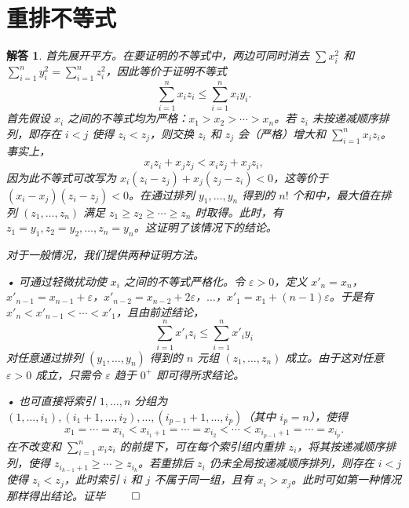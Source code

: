 \documentclass[12pt,UTF8]{ctexbook}
\theoremstyle{exercisestyle}
\theoremstyle{solutionstyle}
\newtheorem*{solution*}{解答}
\newenvironment{solution}
  {\begin{solution*}}
  {\hfill\ensuremath{\qed}\end{solution*}}
\begin{document}
\section{重排不等式}
\begin{solution}
首先展开平方。在要证明的不等式中，两边可同时消去 \(\sum x_i^2\) 和 \(\sum_{i=1}^{n} y_i^2 = \sum_{i=1}^{n} z_i^2\)，因此等价于证明不等式
\[
\sum_{i=1}^{n} x_i z_i \leqslant \sum_{i=1}^{n} x_i y_i.
\]
首先假设 \(x_i\) 之间的不等式均为严格：\(x_1 > x_2 > \cdots > x_n\)。若 \(z_i\) 未按递减顺序排列，即存在 \(i < j\) 使得 \(z_i < z_j\)，则交换 \(z_i\) 和 \(z_j\) 会（严格）增大和 \(\sum_{i=1}^{n} x_i z_i\)。事实上，
\[
x_i z_i + x_j z_j < x_i z_j + x_j z_i,
\]
因为此不等式可改写为 \(x_i(z_i - z_j) + x_j(z_j - z_i) < 0\)，这等价于 \((x_i - x_j)(z_i - z_j) < 0\)。在通过排列 \(y_1, \ldots, y_n\) 得到的 \(n!\) 个和中，最大值在排列 \((z_1, \ldots, z_n)\) 满足 \(z_1 \geqslant z_2 \geqslant \cdots \geqslant z_n\) 时取得。此时，有 \(z_1 = y_1, z_2 = y_2, \ldots, z_n = y_n\)。这证明了该情况下的结论。

对于一般情况，我们提供两种证明方法。

• 可通过轻微扰动使 \(x_i\) 之间的不等式严格化。令 \(\varepsilon > 0\)，定义 \(x'_n = x_n\)，\(x'_{n-1} = x_{n-1} + \varepsilon\)，\(x'_{n-2} = x_{n-2} + 2\varepsilon\)，\(\ldots\)，\(x'_1 = x_1 + (n-1)\varepsilon\)。于是有 \(x'_n < x'_{n-1} < \cdots < x'_1\)，且由前述结论，
\[
\sum_{i=1}^{n} x'_i z_i \leqslant \sum_{i=1}^{n} x'_i y_i
\]
对任意通过排列 \((y_1, \ldots, y_n)\) 得到的 \(n\) 元组 \((z_1, \ldots, z_n)\) 成立。由于这对任意 \(\varepsilon > 0\) 成立，只需令 \(\varepsilon\) 趋于 \(0^+\) 即可得所求结论。

• 也可直接将索引 \(1, \ldots, n\) 分组为 \((1, \ldots, i_1), (i_1 + 1, \ldots, i_2), \ldots, (i_{p-1} + 1, \ldots, i_p)\)（其中 \(i_p = n\)），使得
\[
x_1 = \cdots = x_{i_1} < x_{i_1+1} = \cdots = x_{i_2} < \cdots < x_{i_{p-1}+1} = \cdots = x_{i_p}.
\]
在不改变和 \(\sum_{i=1}^{n} x_i z_i\) 的前提下，可在每个索引组内重排 \(z_i\)，将其按递减顺序排列，使得 \(z_{i_{k-1}+1} \geqslant \cdots \geqslant z_{i_k}\)。若重排后 \(z_i\) 仍未全局按递减顺序排列，则存在 \(i < j\) 使得 \(z_i < z_j\)，此时索引 \(i\) 和 \(j\) 不属于同一组，且有 \(x_i > x_j\)。此时可如第一种情况那样得出结论。证毕
\end{solution}
\end{document}
